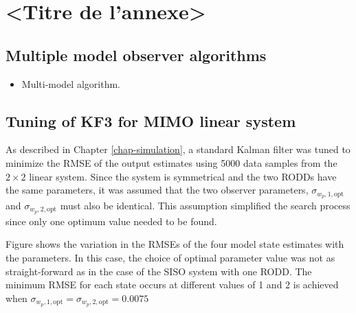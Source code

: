 \chapter{<Titre de l'annexe>}     %
\label{chap-}                   %

\section{Multiple model observer algorithms}

\begin{itemize}
	\item Multi-model algorithm.
\end{itemize}


\section{Tuning of KF3 for MIMO linear system}

As described in Chapter \ref{chap-simulation}, a standard Kalman filter was tuned to minimize the RMSE of the output estimates using 5000 data samples from the $2\times2$ linear system. Since the system is symmetrical and the two RODDs have the same parameters, it was assumed that the two observer parameters, $\sigma_{w_p,1,\text{opt}}$ and $\sigma_{w_p,2,\text{opt}}$ must also be identical. This assumption simplified the search process since only one optimum value needed to be found.

Figure \label{fig:sim-sys-2x2-KF3-tuning} shows the variation in the RMSEs of the four model state estimates with the parameters. In this case, the choice of optimal parameter value was not as straight-forward as in the case of the SISO system with one RODD. The minimum RMSE for each state occurs at different values of  1 and 2 is achieved when $\sigma_{w_p,1,\text{opt}}=\sigma_{w_p,2,\text{opt}}=0.0075$

